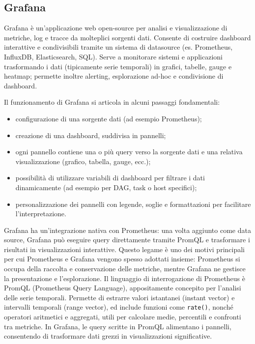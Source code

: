 \subsection{Grafana}
\label{sec:grafana}

Grafana è un’applicazione web open-source per analisi e visualizzazione di metriche, log e tracce da molteplici sorgenti dati. Consente di costruire dashboard interattive e condivisibili tramite un sistema di datasource (es. Prometheus, InfluxDB, Elasticsearch, SQL).
Serve a monitorare sistemi e applicazioni trasformando i dati (tipicamente serie temporali) in grafici, tabelle, gauge e heatmap; permette inoltre alerting, esplorazione ad-hoc e condivisione di dashboard.


Il funzionamento di Grafana si articola in alcuni passaggi fondamentali:

\begin{itemize}
    \item configurazione di una sorgente dati (ad esempio Prometheus);
    \item creazione di una dashboard, suddivisa in pannelli;
    \item ogni pannello contiene una o più query verso la sorgente dati e una relativa visualizzazione (grafico, tabella, gauge, ecc.);
    \item possibilità di utilizzare variabili di dashboard per filtrare i dati dinamicamente (ad esempio per DAG, task o host specifici);
    \item personalizzazione dei pannelli con legende, soglie e formattazioni per facilitare l’interpretazione.
\end{itemize}
Grafana ha un’integrazione nativa con Prometheus: una volta aggiunto come data source, Grafana può eseguire query direttamente tramite PromQL e trasformare i risultati in visualizzazioni interattive. Questo legame è uno dei motivi principali per cui Prometheus e Grafana vengono spesso adottati insieme: Prometheus si occupa della raccolta e conservazione delle metriche, mentre Grafana ne gestisce la presentazione e l’esplorazione.
Il linguaggio di interrogazione di Prometheus è PromQL (Prometheus Query Language), appositamente concepito per l’analisi delle serie temporali. Permette di estrarre valori istantanei (instant vector) e intervalli temporali (range vector), ed include funzioni come \texttt{rate()}, nonché operatori aritmetici e aggregati, utili per calcolare medie, percentili e confronti tra metriche. In Grafana, le query scritte in PromQL alimentano i pannelli, consentendo di trasformare dati grezzi in visualizzazioni significative.


